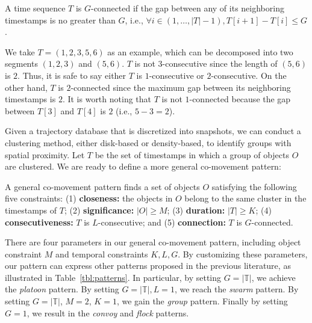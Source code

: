 \begin{definition}[$G$-connected]
A time sequence $T$ is $G$-connected if the gap between any of its neighboring timestamps is no greater than $G$, i.e.,
 $\forall i \in (1,\ldots,|T|-1), T[i+1]-T[i] \leq G$.
\end{definition}

We take $T=(1,2,3,5,6)$ as an example, which can be decomposed into two segments $(1,2,3)$ and $(5,6)$. $T$ is not $3$-consecutive since the length of $(5,6)$ is $2$. Thus, it is safe to say either $T$ is $1$-consecutive or $2$-consecutive. On the other hand, $T$ is $2$-connected since the maximum gap between its neighboring timestamps is $2$. It is worth noting that $T$ is not $1$-connected because the gap between $T[3]$ and $T[4]$ is $2$ (i.e., $5-3=2$).

Given a trajectory database that is discretized into snapshots, we can conduct a clustering method, either disk-based or density-based, to identify groups with spatial proximity. Let $T$ be the set of timestamps in which a group of objects $O$ are clustered. We are ready to define a more general co-movement pattern:
\begin{definition}
A general co-movement pattern finds a set of objects $O$ satisfying the following five constraints: (1) \textbf{closeness:} the objects in $O$ belong to the same cluster in the timestamps of $T$; (2) \textbf{significance:} $|O| \geq M$; (3) \textbf{duration:} $|T| \geq K$; (4) \textbf{consecutiveness:} $T$ is $L$-consecutive; and (5) \textbf{connection:} $T$ is $G$-connected.
\end{definition}
There are four parameters in our general co-movement pattern, including object constraint $M$ and temporal constraints $K,L,G$.   
By customizing these parameters, our pattern can 
express other patterns proposed in the previous literature, as illustrated in Table~\ref{tbl:patterns}. 
In particular, by setting $G=|\mathbb{T}|$, we achieve the \emph{platoon} pattern. By setting $G=|\mathbb{T}|,L=1$, we reach the \emph{swarm} pattern. By setting $G=|\mathbb{T}|$, $M=2$, $K=1$, we gain the \emph{group} pattern. Finally by setting $G=1$, we result in the \emph{convoy} and \emph{flock} patterns. 
